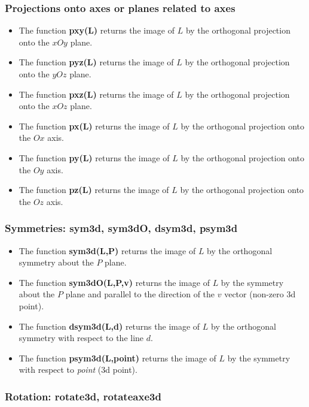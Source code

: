 \subsubsection{Projections onto axes or planes related to axes}

\begin{itemize}
\item The function \textbf{pxy(L)} returns the image of $L$ by the orthogonal projection onto the $xOy$ plane.
\item The function \textbf{pyz(L)} returns the image of $L$ by the orthogonal projection onto the $yOz$ plane.
\item The function \textbf{pxz(L)} returns the image of $L$ by the orthogonal projection onto the $xOz$ plane.
\item The function \textbf{px(L)} returns the image of $L$ by the orthogonal projection onto the $Ox$ axis.
\item The function \textbf{py(L)} returns the image of $L$ by the orthogonal projection onto the $Oy$ axis.
\item The function \textbf{pz(L)} returns the image of $L$ by the orthogonal projection onto the $Oz$ axis.
\end{itemize}

\subsubsection{Symmetries: sym3d, sym3dO, dsym3d, psym3d}

\begin{itemize}
\item The function \textbf{sym3d(L,P)} returns the image of $L$ by the orthogonal symmetry about the $P$ plane.
\item The function \textbf{sym3dO(L,P,v)} returns the image of $L$ by the symmetry about the $P$ plane and parallel to the direction of the $v$ vector (non-zero 3d point).
\item The function \textbf{dsym3d(L,d)} returns the image of $L$ by the orthogonal symmetry with respect to the line $d$.
\item The function \textbf{psym3d(L,point)} returns the image of $L$ by the symmetry with respect to \emph{point} (3d point).
\end{itemize}

\subsubsection{Rotation: rotate3d, rotateaxe3d}

